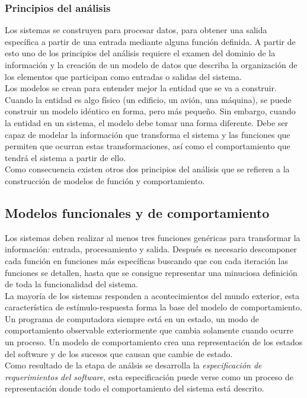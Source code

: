 \subsubsection{Principios del análisis}

Los sistemas se construyen para procesar datos, para obtener una salida específica a partir de una entrada mediante alguna función definida. A partir de esto uno de los principios del análisis requiere el examen del dominio de la información
y la creación de un modelo de datos que describa la organización de los elementos que participan como entradas o salidas del sistema.\\

Los modelos se crean para entender mejor la entidad que se va a construir. Cuando la entidad es algo físico (un edificio, un avión, una máquina), se puede construir un modelo idéntico en forma, pero más pequeño. Sin embargo, cuando la entidad en un sistema,
el modelo debe tomar una forma diferente. Debe ser capaz de modelar la información que transforma el sistema y las funciones que permiten que ocurran estas transformaciones, así como el comportamiento que tendrá el sistema a partir de ello.\\

Como consecuencia existen otros dos principios del análisis que se refieren a la construcción de modelos de función y comportamiento.

\subsection{Modelos funcionales y de comportamiento}
Los sistemas deben realizar al menos tres funciones genéricas para transformar la información: entrada, procesamiento y salida. Después es necesario descomponer cada función en funciones más específicas buscando que con cada iteración 
las funciones se detallen, hasta que se consigue representar una minuciosa definición de toda la funcionalidad del sistema.\\

La mayoría de los sistemas responden a acontecimientos del mundo exterior, esta característica de estímulo-respuesta forma la base del modelo de comportamiento. Un programa de computadora siempre está en un estado, un modo de comportamiento observable
exteriormente que cambia solamente cuando ocurre un proceso. Un modelo de comportamiento crea una representación de los estados del software y de los sucesos que causan que cambie de estado.\\

Como resultado de la etapa de análsis se desarrolla la \emph{especificación de requerimientos del software}, esta especificación puede verse como un proceso de representación donde todo el comportamiento del sistema está descrito.\\
